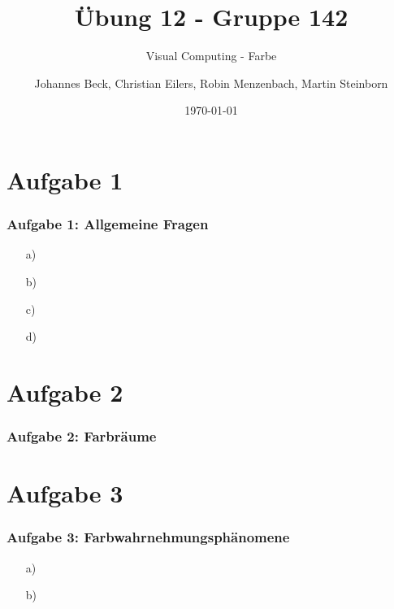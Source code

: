 \documentclass[accentcolor=tud9c,colorbacktitle,inverttitle,landscape,german,presentation,t]{tudbeamer}
\begin{document}
\title{\"Ubung 12 - Gruppe 142}
\subtitle{Visual Computing - Farbe}


\author[Johannes Beck, Christian Eilers, Robin Menzenbach, Martin Steinborn]{Johannes Beck, Christian Eilers, Robin Menzenbach, Martin Steinborn}


\date{\today}

\begin{titleframe}
\end{titleframe}

\section{Aufgabe 1} 
	\begin{frame}
		\frametitle{Aufgabe 1: Allgemeine Fragen}
		\begin{itemize}
			\item[a)]%
			\item[b)]%
			\item[c)]%
			\item[d)]%
		\end{itemize}
	\end{frame}

\section{Aufgabe 2}
	\begin{frame}
		\frametitle{Aufgabe 2: Farbräume}
	\end{frame}

\section{Aufgabe 3}
	\begin{frame}
		\frametitle{Aufgabe 3: Farbwahrnehmungsphänomene}
		\begin{itemize}
			\item[a)]
			\item[b)]
		\end{itemize}
	\end{frame}
\end{document}
